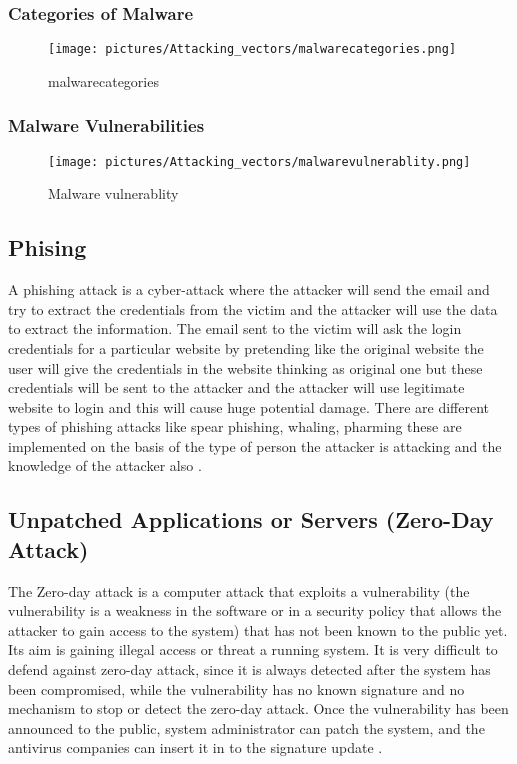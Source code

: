 \documentclass[twocolumn]{article}
\begin{document}
\subsubsection{Categories of Malware}

\begin{figure}[H]
\centering
\texttt{[image: pictures/Attacking\_vectors/malwarecategories.png]}
\caption{malwarecategories}
\end{figure}

\textcolor{red}{\lipsum[1]}

\subsubsection{Malware Vulnerabilities}

\begin{figure}[H]
\centering
\texttt{[image: pictures/Attacking\_vectors/malwarevulnerablity.png]}
\caption{Malware vulnerablity}
\end{figure}
\subsection{Phising}
A phishing attack is a cyber-attack where the attacker will send the email and try to extract the credentials from the victim and the attacker
will use the data to extract the information. The email sent to the victim will ask the login credentials for a particular website by pretending like the
original website the user will give the credentials in the website thinking as original one but these credentials will be sent to the attacker and the attacker
will use legitimate website to login and this will cause huge potential damage. There are different types of phishing attacks like spear phishing, whaling,
pharming these are implemented on the basis of the type of person the attacker is attacking and the knowledge of the attacker also
\cite{kanakam2022bruteforce}.
\subsection{Unpatched Applications or Servers (Zero-Day Attack)}

The Zero-day attack is a computer attack that exploits a vulnerability (the vulnerability is a weakness in the software or in a security policy that allows the attacker to gain access to the system) that has not been known to the public yet. Its aim is gaining illegal access or threat a running system. It is very difficult to defend against zero-day attack, since it is always detected after the system has been compromised, while the vulnerability has no known signature and no mechanism to stop or detect the zero-day attack. Once the vulnerability has been announced to the public, system administrator can patch the system, and the antivirus companies can insert it in to the signature update \cite{al2019zero}.
\end{document}
